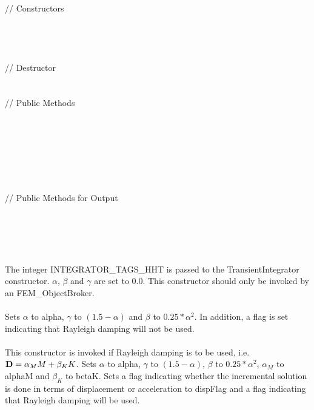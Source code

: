  \\
\indent // Constructors \\
\\ 
\\ 
\\ \\
\indent // Destructor \\
\\ \\
\indent // Public Methods \\
 \\
 \\
\\
\\
 \\ 
\\ \\
\indent // Public Methods for Output\\
\\ 
\\ 
\\

 \\
\\ 
The integer INTEGRATOR\_TAGS\_HHT is passed to the TransientIntegrator
constructor. $\alpha$, $\beta$ and $\gamma$ are set to 0.0. This
constructor should only be invoked by an FEM\_ObjectBroker. \\

\\ 
Sets $\alpha$ to \p alpha, $\gamma$ to $(1.5 - \alpha)$ and $\beta$
to $0.25*\alpha^2$. In addition, a flag is set indicating that Rayleigh
damping will not be used. \\

\\ 
This constructor is invoked if Rayleigh damping is to be used, 
i.e. ${\bf D} = \alpha_M M + \beta_K K$. Sets $\alpha$ to \p alpha,
$\gamma$ to $(1.5 - \alpha)$, $\beta$ to $0.25*\alpha^2$, $\alpha_M$ to
\p alphaM and $\beta_K$ to \p betaK. Sets a flag indicating
whether the incremental solution is done in terms of displacement or
acceleration to \p dispFlag and a flag indicating that Rayleigh
damping will be used. \\ 

